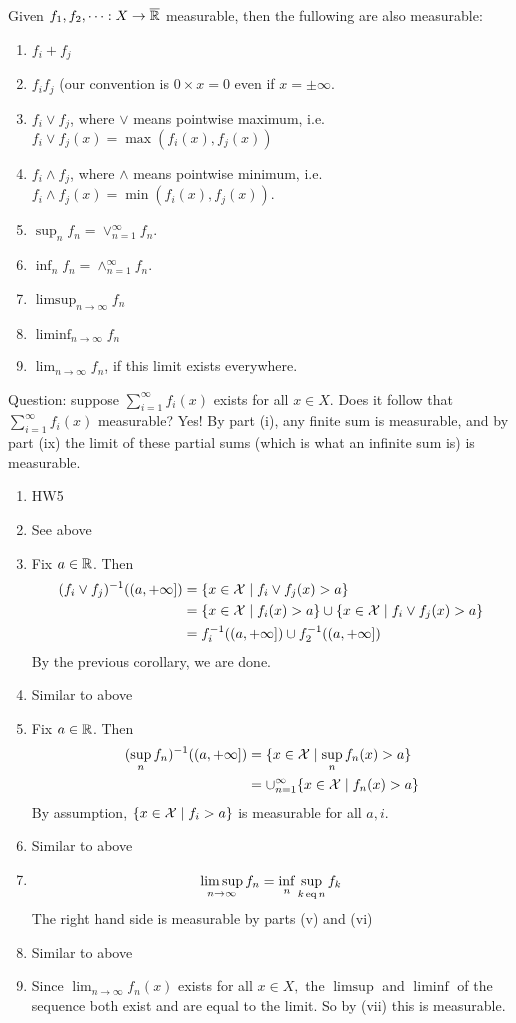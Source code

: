 \documentclass[x11names,reqno,14pt]{extarticle}
\newcommand*{\oo}{\infty}
\newcommand{\seq}[1]{_{#1 = 1}^\oo}
\begin{document}
\thm
Given $f_1, f_2, \dots:X\to\overline{\mathbb{R}}$ measurable, then the fullowing are also measurable: 
\begin{enumerate}[label=(\roman*)]
\item $f_i + f_j$
\item $f_if_j$ (our convention is $0\times x = 0$ even if $x = \pm \oo$. 
\item $f_i \vee f_j$, where $\vee$ means pointwise maximum, i.e. $f_i \vee f_j(x) = \max(f_i(x), f_j(x))$
\item $f_i \wedge f_j$, where $\wedge$ means pointwise minimum, i.e. $f_i \wedge f_j(x)=\min(f_i(x), f_j(x))$. 
\item $\sup_n f_n = \vee\seq{n} f_n$.
\item $\inf_n f_n = \wedge\seq{n} f_n$. 
\item $\limsup_{n\to\oo}f_n$
\item $\liminf_{n\to\oo}f_n$
\item $\lim_{n\to\oo}f_n$, if this limit exists everywhere. 
\end{enumerate}

\rem

Question: suppose $\sum\seq{i}f_i(x)$ exists for all $x\in X$. Does it follow that $\sum\seq{i}f_i(x)$ measurable? Yes! By part (i), any finite sum is measurable, and by part (ix) the limit of these partial sums (which is what an infinite sum is) is measurable. 

\proof
\begin{enumerate}[label=(\roman*)]
\item HW5
\item See above
\item Fix $a \in \mathbb{R}$. Then 
\begin{align*}
(f_i\vee f_j)^{-1}((a, + \oo]) & = \{x \in \mc{X} \mid f_i \vee f_j(x) > a \} \\
										& = \{x\in \mc{X} \mid f_i(x) > a \} \cup \{x \in \mc{X} \mid f_i \vee f_j (x) > a\} \\ 
										& = f_i^{-1}((a, +\oo]) \cup f_2^{-1}((a, +\oo]) \\
\end{align*}
By the previous corollary, we are done. 
\item Similar to above
\item Fix $a \in \mathbb{R}$. Then
\begin{align*}
(\sup_nf_n)^{-1}((a, + \oo]) & = \{x \in \mc{X} \mid \sup_nf_n(x) > a\} \\
										& = \cup\seq{n}\{x \in \mc{X} \mid f_n(x) > a \} \\
\end{align*}
By assumption, $\{x \in \mathcal{X} \mid f_i > a\}$ is measurable for all $a, i$. 
\item Similar to above
\item 
\[
\limsup_{n\to\oo}f_n = \inf_n\sup_{k\eq n}f_k 
\]
The right hand side is measurable by parts (v) and (vi)
\item Similar to above
\item Since $\lim_{n\to\oo}f_n(x)$ exists for all $x \in X,$ the $\limsup$ and $\liminf$ of the sequence both exist and are equal to the limit. So by (vii) this is measurable.
\end{enumerate}
\end{document}
